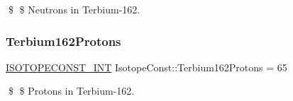\$ \$ Neutrons in Terbium-\/162. \mbox{\label{group___isotope_const-_terbium-_tb162_ga85809b39ba8297f95635fea62501fca6}} 
\subsubsection{\texorpdfstring{Terbium162\+Protons}{Terbium162Protons}}
{\footnotesize\ttfamily \mbox{\hyperlink{group___isotope_const-_macros_ga5f18360b3e99483a35c32d789e62621c}{I\+S\+O\+T\+O\+P\+E\+C\+O\+N\+S\+T\+\_\+\+I\+NT}} Isotope\+Const\+::\+Terbium162\+Protons = 65}

\$ \$ Protons in Terbium-\/162. 